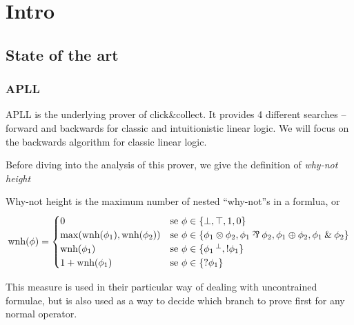 \documentclass[a4paper, 12pt, tesi, english]{report}
\begin{document}
\chapter{Intro}

\section{State of the art}
\subsection{APLL}
APLL is the underlying prover of click\&collect. %
It provides 4 different searches -- forward and backwards for classic and intuitionistic linear logic. 
We will focus on the backwards algorithm for classic linear logic.

Before diving into the analysis of this prover, we give the definition of \textit{why-not height}
\begin{define}
	Why-not height is the maximum number of nested ``why-not''s in a formlua, or
	$$ \text{wnh}(\phi) = 
	\begin{cases}	
		0 & \text{se }\phi \in \{\llbot, \lltop, \llone, \llzero\} \\
		\max(\text{wnh}(\phi_1), \text{wnh}(\phi_2)) & \text{se } \phi \in \{ \phi_1 \llten \phi_2, \phi_1 \llpar \phi_2, \phi_1 \llplus \phi_2, \phi_1 \llwith \phi_2 \} \\
		\text{wnh}(\phi_1) & \text{se }\phi \in \{ \llnot{\phi_1}, \llbang{\phi_1}\} \\
		1 + \text{wnh}(\phi_1) & \text{se }\phi \in \{ \llwn{\phi_1} \} 
	\end{cases}
	$$
\end{define}
This measure is used in their particular way of dealing with uncontrained formulae, but is also used as a way to decide which branch to prove first for any normal operator.
\end{document}
